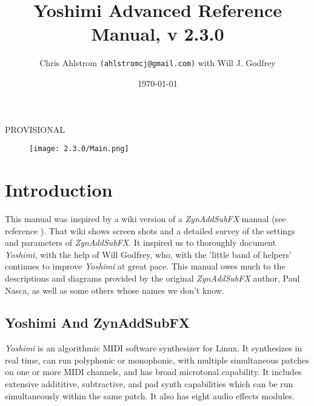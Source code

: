 \documentclass[
 11pt,
 twoside,
 a4paper,
 final                                 %
]{article}
\begin{document}
\title{Yoshimi Advanced Reference Manual, v 2.3.0}
\author{Chris Ahlstrom \texttt{(ahlstromcj@gmail.com)} with Will J. Godfrey}
\date{\today}
\maketitle
PROVISIONAL
\begin{figure}[H]
   \centering
   \texttt{[image: 2.3.0/Main.png]}
\end{figure}

\clearpage                             %

\tableofcontents
\listoffigures                         %
\listoftables                          %

%

\setlength{\parindent}{2em}
\setlength{\parskip}{1ex plus 0.5ex minus 0.2ex}

\section{Introduction}
\label{sec:introduction}

   This manual was inspired by a wiki version of a
   \textsl{ZynAddSubFX} manual (see reference \cite{zynwiki}).  That wiki
   shows screen shots and a
   detailed survey of the settings and parameters of \textsl{ZynAddSubFX}.  It
   inspired us to thoroughly document \textsl{Yoshimi}, with the help of
   Will Godfrey, who, with the 'little band of helpers' continues to improve
   \textsl{Yoshimi} at great pace.
   This manual owes much to the descriptions and diagrams provided by the
   original \textsl{ZynAddSubFX} author, Paul Nasca, as well as some others
   whose names we don't know.

\subsection{Yoshimi And ZynAddSubFX}
\label{subsec:introduction_yoshimi_vs_zyn}

   \textsl{Yoshimi} is an algorithmic MIDI software synthesizer for Linux.
   It synthesizes in real time, can run polyphonic or monophonic, with multiple
   simultaneous patches on one or more MIDI channels, and has broad microtonal
   capability. It includes extensive addititive, subtractive,
   and pad synth capabilities which can be run simultaneously within the
   same patch.  It also has eight audio effects modules.
\end{document}
